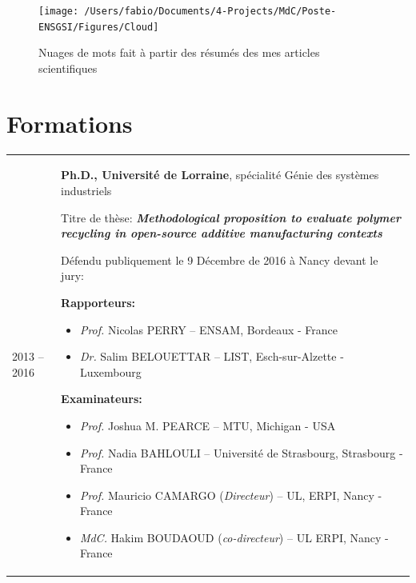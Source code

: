 \documentclass[
  12pt,
  oneside]{book}
\begin{document}
\begin{figure}

{\centering \texttt{[image: /Users/fabio/Documents/4-Projects/MdC/Poste-ENSGSI/Figures/Cloud]} 

}

\caption{Nuages de mots fait à partir des résumés des mes articles scientifiques}\label{fig:unnamed-chunk-2}
\end{figure}

\hypertarget{formations}{%
\section{Formations}\label{formations}}

\begin{tabu} to \linewidth {X[0.4,l] X[2,l]}

2013 -- 2016 & \textbf{Ph.D., Université de Lorraine}, spécialité Génie des systèmes industriels \par
    Titre de thèse: \textbf{\emph{Methodological proposition to evaluate polymer recycling in open-source additive manufacturing contexts}} \par\vspace{5pt}
    
Défendu publiquement le 9 Décembre de 2016 à Nancy devant le jury:\par\vspace{5pt}

    \textbf{Rapporteurs:}
    \begin{itemize}
    
        \item \textit{Prof.} Nicolas PERRY --  ENSAM, Bordeaux - France
        \item \textit{Dr.} Salim BELOUETTAR -- LIST, Esch-sur-Alzette - Luxembourg
    \end{itemize}

\vspace{5pt}
    \textbf{Examinateurs:}
    \begin{itemize}
    
        \item \textit{Prof.} Joshua M. PEARCE -- MTU, Michigan - USA
        \item \textit{Prof.} Nadia BAHLOULI -- Université de Strasbourg, Strasbourg - France
        \item \textit{Prof.} Mauricio CAMARGO (\textit{Directeur}) -- UL, ERPI, Nancy - France
        
        \item \textit{MdC.} Hakim BOUDAOUD (\textit{co-directeur}) -- UL ERPI, Nancy - France
        

\end{itemize}
\end{tabu}
\end{document}
